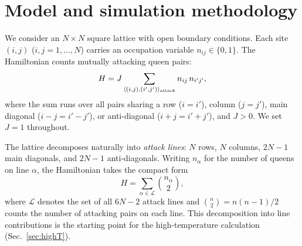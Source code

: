 \documentclass[aps, pre, reprint, amsmath, amssymb, superscriptaddress, floatfix]{revtex4-2}
\begin{document}
\section{Model and simulation methodology}
\label{sec:model}

We consider an $N \times N$ square lattice with open boundary
conditions.  Each site $(i,j)$ ($i,j = 1,\ldots,N$) carries an
occupation variable $n_{ij} \in \{0,1\}$.  The Hamiltonian counts
mutually attacking queen pairs:
\begin{equation}
  H = J \sum_{\langle (i,j),(i',j') \rangle_{\rm attack}}
  n_{ij}\, n_{i'j'},
  \label{eq:H}
\end{equation}
where the sum runs over all pairs sharing a row ($i = i'$), column
($j = j'$), main diagonal ($i - j = i' - j'$), or anti-diagonal
($i + j = i' + j'$), and $J > 0$.  We set $J = 1$ throughout.

The lattice decomposes naturally into \textit{attack lines}: $N$ rows,
$N$ columns, $2N-1$ main diagonals, and $2N-1$ anti-diagonals.
Writing $n_\alpha$ for the number of queens on line $\alpha$, the
Hamiltonian takes the compact form
\begin{equation}
  H = \sum_{\alpha \in \mathcal{L}} \binom{n_\alpha}{2},
  \label{eq:H_lines}
\end{equation}
where $\mathcal{L}$ denotes the set of all $6N - 2$ attack lines and
$\binom{n}{2} = n(n-1)/2$ counts the number of attacking pairs on
each line.  This decomposition into line contributions is the
starting point for the high-temperature calculation
(Sec.~\ref{sec:highT}).
\end{document}
